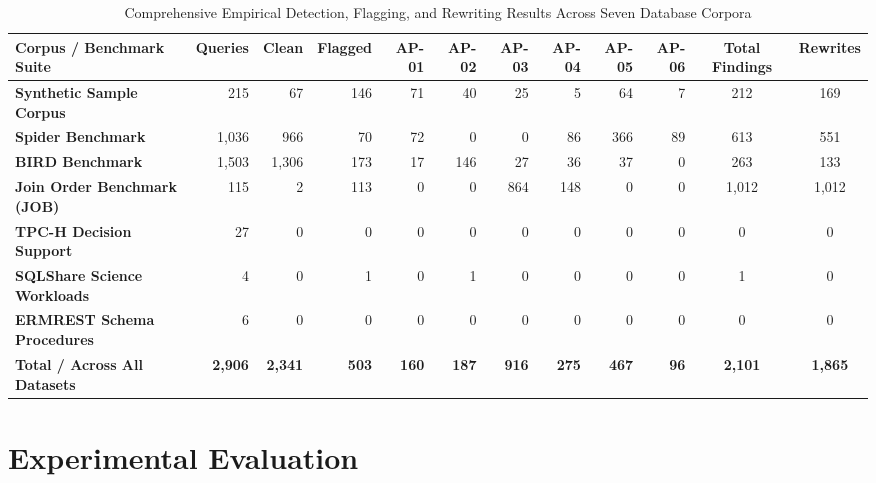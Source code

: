 \documentclass[conference]{IEEEtran}
\begin{document}
\begin{table}[t]
\caption{Comprehensive Empirical Detection, Flagging, and Rewriting Results Across Seven Database Corpora}
\label{tab:benchmark_results}
\centering
\begin{tabular}{lrrrrrrrrrcc}
\toprule
\textbf{Corpus / Benchmark Suite} & \textbf{Queries} & \textbf{Clean} & \textbf{Flagged} & \textbf{AP-01} & \textbf{AP-02} & \textbf{AP-03} & \textbf{AP-04} & \textbf{AP-05} & \textbf{AP-06} & \textbf{Total Findings} & \textbf{Rewrites} \\
\midrule
\textbf{Synthetic Sample Corpus} & 215 & 67 & 146 & 71 & 40 & 25 & 5 & 64 & 7 & 212 & 169 \\
\textbf{Spider Benchmark} \cite{yu2018spider} & 1,036 & 966 & 70 & 72 & 0 & 0 & 86 & 366 & 89 & 613 & 551 \\
\textbf{BIRD Benchmark} \cite{li2024bird} & 1,503 & 1,306 & 173 & 17 & 146 & 27 & 36 & 37 & 0 & 263 & 133 \\
\textbf{Join Order Benchmark (JOB)} \cite{leis2015good} & 115 & 2 & 113 & 0 & 0 & 864 & 148 & 0 & 0 & 1,012 & 1,012 \\
\textbf{TPC-H Decision Support} \cite{tpch} & 27 & 0 & 0 & 0 & 0 & 0 & 0 & 0 & 0 & 0 & 0 \\
\textbf{SQLShare Science Workloads} & 4 & 0 & 1 & 0 & 1 & 0 & 0 & 0 & 0 & 1 & 0 \\
\textbf{ERMREST Schema Procedures} & 6 & 0 & 0 & 0 & 0 & 0 & 0 & 0 & 0 & 0 & 0 \\
\midrule
\textbf{Total / Across All Datasets} & \textbf{2,906} & \textbf{2,341} & \textbf{503} & \textbf{160} & \textbf{187} & \textbf{916} & \textbf{275} & \textbf{467} & \textbf{96} & \textbf{2,101} & \textbf{1,865} \\
\bottomrule
\end{tabular}
\end{table}

\section{Experimental Evaluation}
\end{document}
